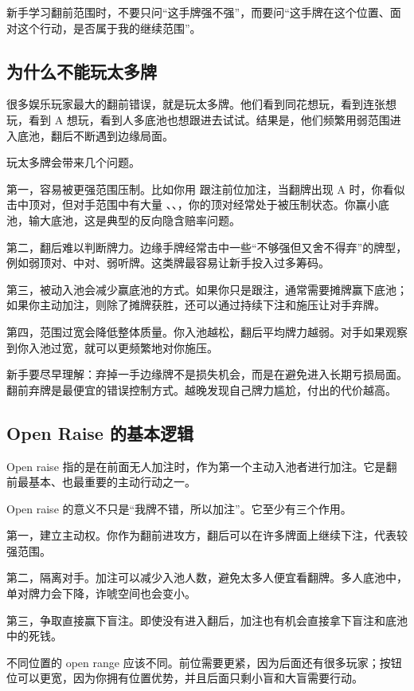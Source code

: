 新手学习翻前范围时，不要只问“这手牌强不强”，而要问“这手牌在这个位置、面对这个行动，是否属于我的继续范围”。

\subsection{为什么不能玩太多牌}

很多娱乐玩家最大的翻前错误，就是玩太多牌。他们看到同花想玩，看到连张想玩，看到 A 想玩，看到人多底池也想跟进去试试。结果是，他们频繁用弱范围进入底池，翻后不断遇到边缘局面。

玩太多牌会带来几个问题。

第一，容易被更强范围压制。比如你用  跟注前位加注，当翻牌出现 A 时，你看似击中顶对，但对手范围中有大量 、、，你的顶对经常处于被压制状态。你赢小底池，输大底池，这是典型的反向隐含赔率问题。

第二，翻后难以判断牌力。边缘手牌经常击中一些“不够强但又舍不得弃”的牌型，例如弱顶对、中对、弱听牌。这类牌最容易让新手投入过多筹码。

第三，被动入池会减少赢底池的方式。如果你只是跟注，通常需要摊牌赢下底池；如果你主动加注，则除了摊牌获胜，还可以通过持续下注和施压让对手弃牌。

第四，范围过宽会降低整体质量。你入池越松，翻后平均牌力越弱。对手如果观察到你入池过宽，就可以更频繁地对你施压。

新手要尽早理解：弃掉一手边缘牌不是损失机会，而是在避免进入长期亏损局面。翻前弃牌是最便宜的错误控制方式。越晚发现自己牌力尴尬，付出的代价越高。

\subsection{Open Raise 的基本逻辑}

Open raise 指的是在前面无人加注时，作为第一个主动入池者进行加注。它是翻前最基本、也最重要的主动行动之一。

Open raise 的意义不只是“我牌不错，所以加注”。它至少有三个作用。

第一，建立主动权。你作为翻前进攻方，翻后可以在许多牌面上继续下注，代表较强范围。

第二，隔离对手。加注可以减少入池人数，避免太多人便宜看翻牌。多人底池中，单对牌力会下降，诈唬空间也会变小。

第三，争取直接赢下盲注。即使没有进入翻后，加注也有机会直接拿下盲注和底池中的死钱。

不同位置的 open range 应该不同。前位需要更紧，因为后面还有很多玩家；按钮位可以更宽，因为你拥有位置优势，并且后面只剩小盲和大盲需要行动。

